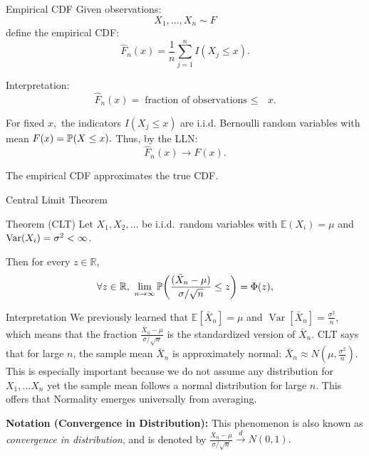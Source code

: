 
\begin{frame}{Empirical CDF}
Given observations:
\[
X_1,\dots,X_n \sim F
\]
define the empirical CDF:
\[
{
\hat F_n(x)
=
\frac1n
\sum_{j=1}^n
I(X_j\le x).
}
\]

Interpretation:
\[
\hat F_n(x)
=
\text{fraction of observations $\leq$ }x.
\]


For fixed $x,$ the indicators $I(X_j\le x)$ are i.i.d. Bernoulli random variables with mean $F(x)=\mathbb{P}(X\le x).$ Thus, by the LLN:
\[
{
\hat F_n(x)\to F(x).
}
\]

The empirical CDF approximates the true CDF.
\end{frame}





\begin{frame}{Central Limit Theorem}

\begin{keybox}{Theorem (CLT)}
Let $X_1,X_2,\dots$ be i.i.d.\ random variables with
$\mathbb{E}(X_i)=\mu$ and $\operatorname{Var}(X_i)=\sigma^2<\infty$.

Then for every $z\in \mathbb{R}$,
\[
\forall z\in \mathbb{R},\ \lim_{n\to\infty}
\mathbb{P}\!\left(
\frac{
(\bar X_n-\mu)
}{
\sigma /\sqrt n
}
\le z
\right)
=
\Phi(z),
\]
\end{keybox}


\begin{keybox}{Interpretation}
We previously learned that $\mathbb{E}[\bar X_n] = \mu$ and $\operatorname{Var}[\bar X_n]=\frac{\sigma^2}{n}$, which means that the fraction $\frac{\bar X_n-\mu}{\sigma /\sqrt{n}}$ is the standardized version of $\bar X_n$. CLT says that for large \(n\), the sample mean
$\bar X_n$
is approximately normal: $\bar X_n
\approx
N\!\left(
\mu,
\frac{\sigma^2}{n}
\right).$
This is especially important because we do not assume any distribution for $X_1,\dots X_n$ yet the sample mean follows a normal distribution for large $n.$ This offers that Normality emerges universally from averaging.
\end{keybox}

\textbf{Notation (Convergence in Distribution):} This phenomenon is also known as \textit{convergence in distribution}, and is denoted by $\frac{
 \bar X_n-\mu
}{
\sigma/\sqrt n
}
\xrightarrow[]{d}
N(0,1).$
\end{frame}



